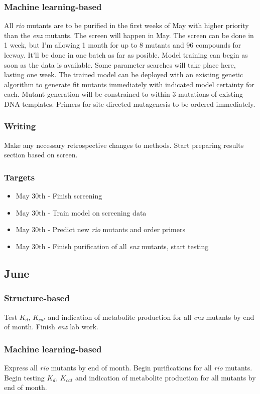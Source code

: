 \documentclass{article}
\begin{document}
\subsubsection{Machine learning-based}
All \textit{rio} mutants are to be purified in the first weeks of May with higher priority than the \textit{enz} mutants.
The screen will happen in May. The screen can be done in 1 week, but I'm allowing 1 month for up to 8 mutants and 96 compounds for leeway. It'll be done in one batch as far as posible. %
Model training can begin as soon as the data is available. Some parameter searches will take place here, lasting one week.  %
The trained model can be deployed with an existing genetic algorithm to generate fit mutants immediately with indicated model certainty for each. Mutant generation will be constrained to within 3 mutations of existing DNA templates. Primers for site-directed mutagenesis to be ordered immediately. %
\subsubsection{Writing}
Make any necessary retrospective changes to methods. Start preparing results section based on screen.
\subsubsection{Targets}
\begin{itemize}
\item May 30th - Finish screening
\item May 30th - Train model on screening data
\item May 30th - Predict new \textit{rio} mutants and order primers
\item May 30th - Finish purification of all \textit{enz} mutants, start testing
\end{itemize}

\subsection{June}
\subsubsection{Structure-based}
Test $K_d$, $K_{cat}$ and indication of metabolite production for all \textit{enz} mutants by end of month. Finish \textit{enz} lab work.
\subsubsection{Machine learning-based}
Express all \textit{rio} mutants by end of month. Begin purifications for all \textit{rio} mutants. Begin testing $K_d$, $K_{cat}$ and indication of metabolite production for all mutants by end of month.
\end{document}
